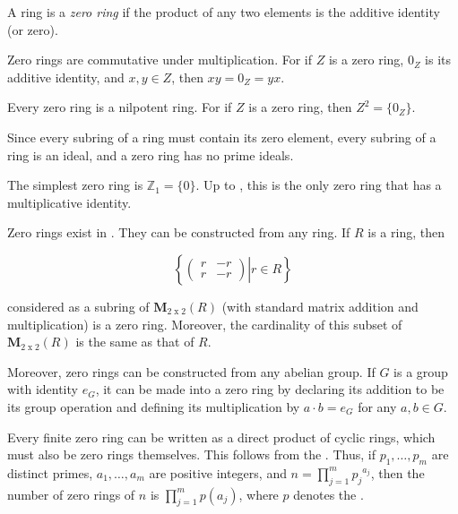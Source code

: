 \documentclass[12pt]{article}
\begin{document}
A ring is a {\sl zero ring\/} if the product of any two elements is the additive identity (or zero).

Zero rings are commutative under multiplication.  For if $Z$ is a zero ring, 
$0_Z$ is its additive identity, and $x,y \in Z$, then $xy=0_Z=yx.$

Every zero ring is a nilpotent ring.  For if $Z$ is a zero ring, then $Z^2=\{0_Z\}$.

Since every subring of a ring must contain its zero element, every subring of a ring is an ideal, and a zero ring has no prime ideals.

The simplest zero ring is ${\mathbb Z}_1=\{0\}$.  Up to , this is the only zero ring that has a multiplicative identity.

Zero rings exist in .  They can be constructed from any ring.  If $R$ is a ring, then

$$\left\{ \left. \left( \begin{array}{cc}
r & -r \\
r & -r \end{array} \right) \right| r \in R \right\}$$

considered as a subring of ${\mathbf M}_{2\operatorname{x}2}(R)$ (with standard matrix addition and multiplication) is a zero ring.  Moreover, the cardinality of this subset of ${\mathbf M}_{2\operatorname{x}2}(R)$ is the same as that of $R$.

Moreover, zero rings can be constructed from any abelian group.  If $G$ is a group with identity $e_G$, it can be made into a zero ring by declaring its addition to be its group operation and defining its multiplication by $a \cdot b=e_G$ for any $a,b \in G$.

Every finite zero ring can be written as a direct product of cyclic rings, which must also be zero rings themselves.  This follows from the .  Thus, if $p_1, \ldots , p_m$ are distinct primes, $a_1, \ldots , a_m$ are positive integers, and $\displaystyle n= \prod_{j=1}^m {p_j}^{a_j}$, then the number of zero rings of  $n$ is $\displaystyle \prod_{j=1}^m p(a_j)$, where $p$ denotes the .
\end{document}

